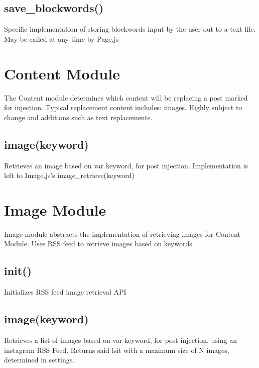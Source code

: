 \documentclass[12pt, titlepage]{article}
\begin{document}
\subsection{save\_blockwords()}
Specific implementation of storing blockwords input by the user out to a text file. May be called at any time by Page.js

\section{Content Module}
The Content module determines which content will be replacing a post marked for injection. Typical replacement content includes: images. Highly subject to change and additions such as text replacements.
\subsection{image(keyword)}
Retrieves an image based on var keyword, for post injection. Implementation is left to Image.js's image\_retrieve(keyword)

\section{Image Module}
Image module abstracts the implementation of retrieving images for Content Module. Uses RSS feed to retrieve images based on keywords
\subsection{init()}
Initializes RSS feed image retrieval API
\subsection{image(keyword)}
Retrieves a list of images based on var keyword, for post injection, using an instagram RSS Feed. Returns said lsit with a mazimum size of N images, determined in settings.
\end{document}

